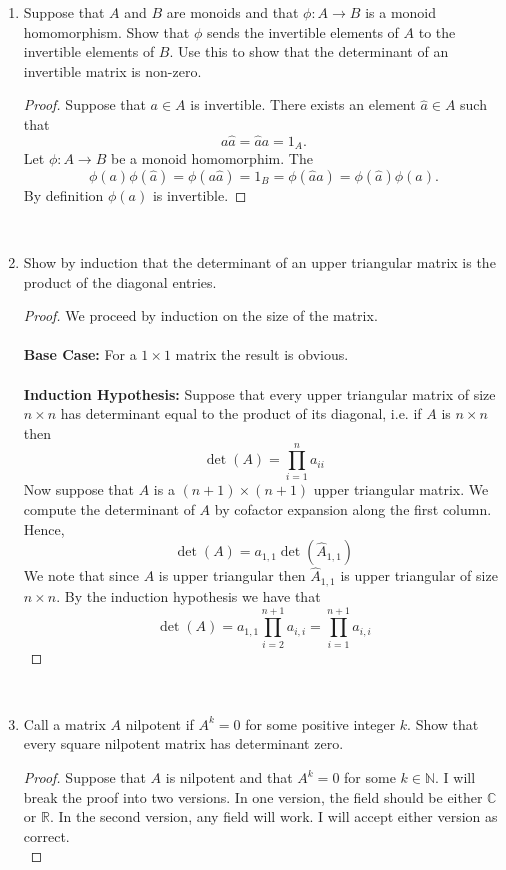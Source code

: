 \documentclass[12pt,letterpaper]{article}
\theoremstyle{plain}
\theoremstyle{definition}
\begin{document}
\begin{enumerate}[1.]
\item Suppose that $A$ and $B$ are monoids and that $\phi:A\rightarrow B$ is a monoid homomorphism. Show that $\phi$ sends the invertible elements of $A$ to the invertible elements of $B$. Use this to show that the determinant of an invertible matrix is non-zero. \\
\begin{proof}
Suppose that $a\in A$ is invertible. There exists an element $\hat{a}\in A$ such that 
\[a\hat{a}=\hat{a}a=1_A.\]
Let $\phi:A\rightarrow B$ be a monoid homomorphim. The 
\[\phi(a)\phi(\hat{a})=\phi(a\hat{a})=1_B=\phi(\hat{a}a)=\phi(\hat{a})\phi(a).\]
By definition $\phi(a)$ is invertible. 
\end{proof}
\ \\
\item Show by induction that the determinant of an upper triangular matrix is the product of the diagonal entries. \\
\begin{proof} We proceed by induction on the size of the matrix.\\
\ \\
{\bf Base Case: }For a $1\times 1$ matrix the result is obvious. \\
\ \\
{\bf Induction Hypothesis: }Suppose that every upper triangular matrix of size $n\times n$ has determinant equal to the product of its diagonal, i.e. if $A$ is $n\times n$ then 
\[\det(A)=\prod_{i=1}^n a_{ii}\]
Now suppose that $A$ is a $(n+1)\times (n+1)$ upper triangular matrix. We compute the determinant of $A$ by cofactor expansion along the first column. 
Hence,
\[\det(A)=a_{1,1}\det(\hat{A}_{1,1})\]
We note that since $A$ is upper triangular then $\hat{A}_{1,1}$ is upper triangular of size $n\times n$. By the induction hypothesis we have that 
\[\det(A)=a_{1,1}\prod_{i=2}^{n+1}a_{i,i}=\prod_{i=1}^{n+1}a_{i,i}\]
\end{proof}
\ \\
\item Call a matrix $A$ nilpotent if $A^k=0$ for some positive integer $k$. Show that every square nilpotent matrix has determinant zero. \\
\begin{proof}
Suppose that $A$ is nilpotent and that $A^k=0$ for some $k\in \mathbb{N}$. I will break the proof into two versions. In one version, the field should be either $\mathbb{C}$ or $\mathbb{R}$. In the second version, any field will work. I will accept either version as correct.  \\

\end{proof}
\end{enumerate}
\end{document}
